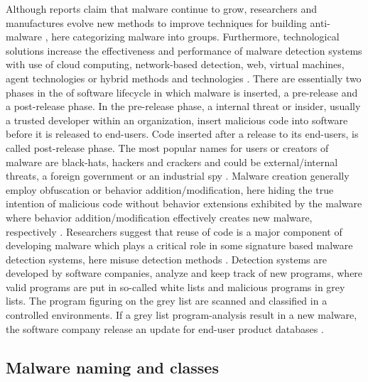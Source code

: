 \documentclass[12pt]{article} %
\begin{document}
Although reports claim that malware continue to grow, researchers and manufactures evolve new methods to improve techniques for building anti-malware \cite{Asurveyonmalware}, here categorizing malware into groups. Furthermore, technological solutions increase the effectiveness and performance of malware detection systems with use of cloud computing, network-based detection, web, virtual machines, agent technologies or hybrid methods and technologies \cite{Asurveyonmalware}. There are essentially two phases in the of software lifecycle in which malware is inserted, a pre-release and a post-release phase. In the pre-release phase, a internal threat or insider, usually a trusted developer within an organization, insert malicious code into software before it is released to end-users. Code inserted  after a release to its end-users, is called post-release phase. The most popular names for users or creators of malware are black-hats, hackers and crackers and could be external/internal threats, a foreign government or an industrial spy \cite{idika2007survey}. Malware creation generally employ obfuscation or behavior addition/modification, here hiding the true intention of malicious code without behavior extensions exhibited by the malware where behavior addition/modification effectively creates new malware, respectively \cite{idika2007survey}. 
Researchers suggest that reuse of code is a major component of developing malware which plays a critical role in some signature based malware detection systems, here misuse detection methods \cite{idika2007survey}. Detection systems are developed by software companies, analyze and keep track of new programs, where valid programs are put in so-called white lists and malicious programs in grey lists. The program figuring on the grey list are scanned and classified in a controlled environments. If a grey list program-analysis result in a new malware, the software company release an update for end-user product databases \cite{Asurveyonmalware}. 

\subsection{Malware naming and classes}
\end{document}
